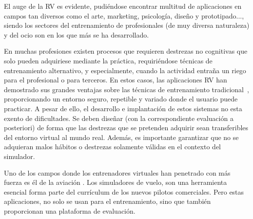 
El auge de la \ac{RV} es evidente, pudiéndose encontrar multitud de aplicaciones en campos tan diversos como el arte, marketing, psicología, diseño y prototipado..., siendo los sectores del entrenamiento de profesionales (de muy diversa naturaleza) y del ocio son en los que más se ha desarrollado.

 En muchas profesiones existen procesos que requieren destrezas no cognitivas que solo pueden adquiriese mediante la práctica, requiriéndose técnicas de entrenamiento alternativo, y especialmente, cuando la actividad entraña un riego para el profesional o para terceros. En estos casos, las aplicaciones \ac{RV} han demostrado sus grandes ventajas sobre las técnicas de entrenamiento tradicional~\cite{PATEL2017266.e7}, proporcionando un entorno seguro, repetible y variado donde el usuario puede practicar. A pesar de ello, el desarrollo e implantación de estos sistemas no esta exento de dificultades. Se deben diseñar (con la correspondiente evaluación a posteriori) de forma que las destrezas que se pretenden adquirir sean transferibles del entorno virtual al mundo real. Además, es importante garantizar que no se adquieran malos hábitos o destrezas solamente válidas en el contexto del simulador.

Uno de los campos donde los entrenadores virtuales han penetrado con más fuerza es él de la aviación \cite{lee2017flight}. Los simuladores de vuelo, son una herramienta esencial forma parte del currículum de los nuevos pilotos comerciales\cite{piloto}. Pero estas aplicaciones, no solo se usan para el entrenamiento, sino que también proporcionan una plataforma de evaluación. %

